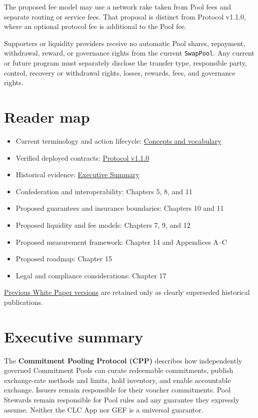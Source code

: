 \documentclass[11pt]{article}
\begin{document}
The proposed fee model may use a network rake taken from Pool fees and separate routing or service fees. That proposal is distinct from Protocol v1.1.0, where an optional protocol fee is additional to the Pool fee.

Supporters or liquidity providers receive no automatic Pool shares, repayment, withdrawal, reward, or governance rights from the current \texttt{SwapPool}. Any current or future program must separately disclose the transfer type, responsible party, control, recovery or withdrawal rights, losses, rewards, fees, and governance rights.

\section*{Reader map}

\begin{itemize}[leftmargin=*]
\item Current terminology and action lifecycle: \href{https://docs.cosmolocal.credit/introduction/concepts}{Concepts and vocabulary}
\item Verified deployed contracts: \href{https://docs.cosmolocal.credit/protocol/overview}{Protocol v1.1.0}
\item Historical evidence: \href{https://docs.cosmolocal.credit/white-paper/executive-summary}{Executive Summary}
\item Confederation and interoperability: Chapters 5, 8, and 11
\item Proposed guarantees and insurance boundaries: Chapters 10 and 11
\item Proposed liquidity and fee models: Chapters 7, 9, and 12
\item Proposed measurement framework: Chapter 14 and Appendices A--C
\item Proposed roadmap: Chapter 15
\item Legal and compliance considerations: Chapter 17
\end{itemize}
\href{https://docs.cosmolocal.credit/white-paper/archive}{Previous White Paper versions} are retained only as clearly superseded historical publications.

\section*{Executive summary}

The \textbf{Commitment Pooling Protocol (CPP)} describes how independently governed Commitment Pools can curate redeemable commitments, publish exchange-rate methods and limits, hold inventory, and enable accountable exchange. Issuers remain responsible for their voucher commitments. Pool Stewards remain responsible for Pool rules and any guarantee they expressly assume. Neither the CLC App nor GEF is a universal guarantor.
\end{document}
